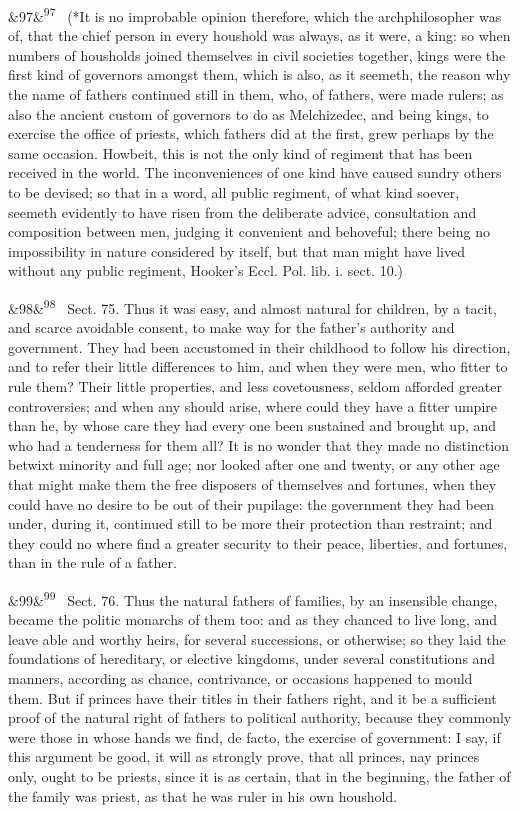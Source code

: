 \documentclass[12pt]{article}
\newcommand{\para}[1][]{\par\noindent\ifx&#1&\else\textsuperscript{\footnotesize #1}~\fi}
\begin{document}
\para[97] (*It is no improbable opinion therefore, which the archphilosopher was of, that the chief person in every houshold was always, as it were, a king: so when numbers of housholds joined themselves in civil societies together, kings were the first kind of governors amongst them, which is also, as it seemeth, the reason why the name of fathers continued still in them, who, of fathers, were made rulers; as also the ancient custom of governors to do as Melchizedec, and being kings, to exercise the office of priests, which fathers did at the first, grew perhaps by the same occasion. Howbeit, this is not the only kind of regiment that has been received in the world. The inconveniences of one kind have caused sundry others to be devised; so that in a word, all public regiment, of what kind soever, seemeth evidently to have risen from the deliberate advice, consultation and composition between men, judging it convenient and behoveful; there being no impossibility in nature considered by itself, but that man might have lived without any public regiment, Hooker's Eccl. Pol. lib. i. sect. 10.)

\para[98] Sect. 75. Thus it was easy, and almost natural for children, by a tacit, and scarce avoidable consent, to make way for the father's authority and government. They had been accustomed in their childhood to follow his direction, and to refer their little differences to him, and when they were men, who fitter to rule them? Their little properties, and less covetousness, seldom afforded greater controversies; and when any should arise, where could they have a fitter umpire than he, by whose care they had every one been sustained and brought up, and who had a tenderness for them all? It is no wonder that they made no distinction betwixt minority and full age; nor looked after one and twenty, or any other age that might make them the free disposers of themselves and fortunes, when they could have no desire to be out of their pupilage: the government they had been under, during it, continued still to be more their protection than restraint; and they could no where find a greater security to their peace, liberties, and fortunes, than in the rule of a father.

\para[99] Sect. 76. Thus the natural fathers of families, by an insensible change, became the politic monarchs of them too: and as they chanced to live long, and leave able and worthy heirs, for several successions, or otherwise; so they laid the foundations of hereditary, or elective kingdoms, under several constitutions and manners, according as chance, contrivance, or occasions happened to mould them. But if princes have their titles in their fathers right, and it be a sufficient proof of the natural right of fathers to political authority, because they commonly were those in whose hands we find, de facto, the exercise of government: I say, if this argument be good, it will as strongly prove, that all princes, nay princes only, ought to be priests, since it is as certain, that in the beginning, the father of the family was priest, as that he was ruler in his own houshold.
\end{document}
